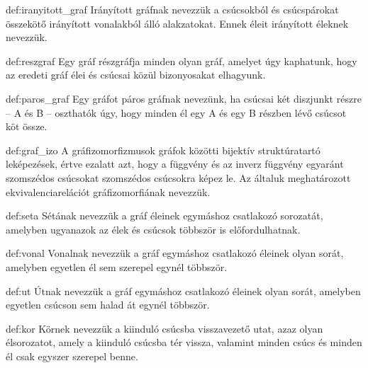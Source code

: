 \begin{definition}{def:iranyitott_graf}
    Irányított gráfnak nevezzük a csúcsokból és csúcspárokat összekötő irányított vonalakból álló alakzatokat. Ennek éleit irányított éleknek nevezzük.
\end{definition}

\begin{definition}[Részgráf]{def:reszgraf}
    Egy gráf részgráfja minden olyan gráf, amelyet úgy kaphatunk, hogy az eredeti gráf élei és csúcsai közül bizonyosakat elhagyunk.
\end{definition}

\begin{definition}{def:paros_graf}
    Egy gráfot páros gráfnak nevezünk, ha csúcsai két diszjunkt részre – A és B – oszthatók úgy, hogy minden él egy A és egy B részben lévő csúcsot köt össze.
\end{definition}

\begin{definition}[Gráfizomorfizmus]{def:graf_izo}
    A gráfizomorfizmusok gráfok közötti bijektív struktúratartó leképezések, értve ezalatt azt, hogy a függvény és az inverz függvény egyaránt szomszédos csúcsokat szomszédos csúcsokra képez le. Az általuk meghatározott ekvivalenciarelációt gráfizomorfiának nevezzük.
\end{definition}

\begin{definition}[Séta]{def:seta}
    Sétának nevezzük a gráf éleinek egymáshoz csatlakozó sorozatát, amelyben ugyanazok az élek és csúcsok többször is előfordulhatnak.
\end{definition}

\begin{definition}[Vonal]{def:vonal}
    Vonalnak nevezzük a gráf egymáshoz csatlakozó éleinek olyan sorát, amelyben egyetlen él sem szerepel egynél többször.
\end{definition}

\begin{definition}[Út]{def:ut}
    Útnak nevezzük a gráf egymáshoz csatlakozó éleinek olyan sorát, amelyben egyetlen csúcson sem halad át egynél többször.
\end{definition}

\begin{definition}[Kör]{def:kor}
    Körnek nevezzük a kiinduló csúcsba visszavezető utat, azaz olyan élsorozatot, amely a kiinduló csúcsba tér vissza, valamint minden csúcs és minden él csak egyszer szerepel benne.
\end{definition}

